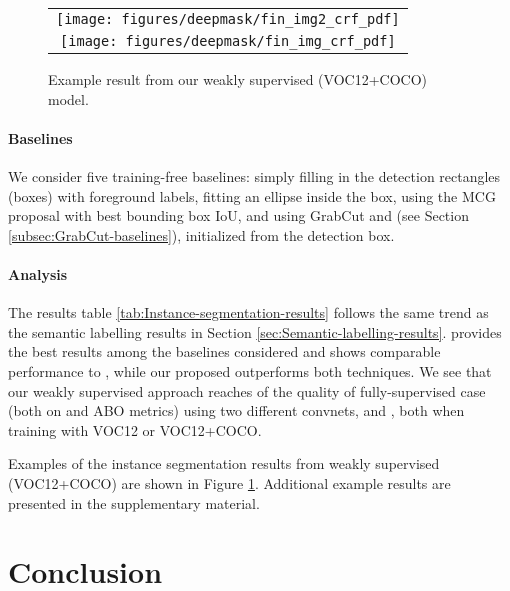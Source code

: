 \documentclass[10pt,english,british,twocolumn]{article}
\providecommand{\tabularnewline}{\\}
\begin{document}
\begin{figure}
\begin{centering}
\begin{tabular}{c}
\texttt{[image: figures/deepmask/fin\_img2\_crf\_pdf]}\tabularnewline
\texttt{[image: figures/deepmask/fin\_img\_crf\_pdf]}\tabularnewline
\end{tabular}\vspace{-0.5em}
\par\end{centering}
\caption{\label{fig:Instance-segmentation-example}Example result from our
weakly supervised  (VOC12+COCO) model.}
\vspace{-1em}
\end{figure}


\paragraph{Baselines}

We consider five training-free baselines: simply filling in the detection
rectangles (boxes) with foreground labels, fitting an ellipse inside
the box, using the MCG proposal with best bounding box IoU, and using
GrabCut and  (see Section \ref{subsec:GrabCut-baselines}),
initialized from the detection box. 

\paragraph{Analysis}

The results table \ref{tab:Instance-segmentation-results} follows
the same trend as the semantic labelling results in Section \ref{sec:Semantic-labelling-results}.
 provides the best results among the baselines
considered and shows comparable performance to ,
while our proposed  outperforms both techniques.
We see that our weakly supervised approach reaches 
of the quality of fully-supervised case (both on 
and ABO metrics) using two different convnets, 
and , both when training with VOC12 or VOC12+COCO. 

Examples of the instance segmentation results from weakly supervised
 (VOC12+COCO) are shown in Figure \ref{fig:Instance-segmentation-example}.
Additional example results are presented in the supplementary material.

\section{\label{sec:Conclusion}Conclusion}
\end{document}
